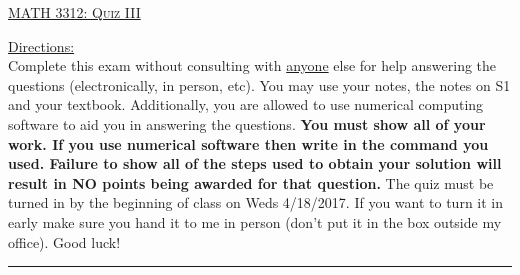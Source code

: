 \documentclass[10pt, a4paper]{article}
\theoremstyle{break}
\begin{document}
\begin{center}
{\large \textsc{\underline{MATH 3312: Quiz III}}}
\vspace{0.125in}
\end{center}
\underline{Directions:} \\
Complete this exam without consulting with \underline{anyone} else for help answering the questions (electronically, in person, etc). You may use your notes, the notes on S1 and your textbook. Additionally, you are allowed to use numerical computing software to aid you in answering the questions. \textbf{You must show all of your work. If you use numerical software then write in the command you used. Failure to show all of the steps used to obtain your solution will result in NO points being awarded for that question. } 
\noindent The quiz must be turned in by the beginning of class on Weds 4/18/2017. If you want to turn it in early make sure you hand it to me in person (don't put it in the box outside my office). Good luck! \\
\noindent\rule{15cm}{0.4pt}

\vspace{0.25in}
\end{document}
